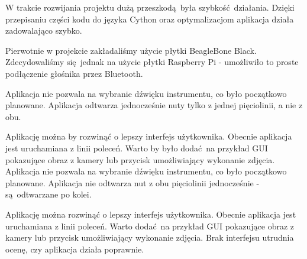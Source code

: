 \documentclass[12pt]{article}
\begin{document}
W trakcie rozwijania projektu dużą przeszkodą była szybkość działania. Dzięki przepisaniu części kodu do języka Cython oraz optymalizacjom aplikacja działa zadowalająco szybko.
	
Pierwotnie w projekcie zakładaliśmy użycie płytki BeagleBone Black. Zdecydowaliśmy się jednak na użycie płytki Raspberry Pi - umożliwiło to proste podłączenie głośnika przez Bluetooth.
	
Aplikacja nie pozwala na wybranie dźwięku instrumentu, co było początkowo planowane. Aplikacja odtwarza jednocześnie nuty tylko z jednej pięciolinii, a nie z obu.

Aplikację można by rozwinąć o lepszy interfejs użytkownika. Obecnie aplikacja jest uruchamiana z linii poleceń. Warto by było dodać na przykład GUI pokazujące obraz z kamery lub przycisk umożliwiający wykonanie zdjęcia.
Aplikacja nie pozwala na wybranie dźwięku instrumentu, co było początkowo planowane. Aplikacja nie odtwarza nut z obu pięciolinii jednocześnie - są odtwarzane po kolei.
	
Aplikację można rozwinąć o lepszy interfejs użytkownika. Obecnie aplikacja jest uruchamiana z linii poleceń. Warto dodać na przykład GUI pokazujące obraz z kamery lub przycisk umożliwiający wykonanie zdjęcia. Brak interfejsu utrudnia ocenę, czy aplikacja działa poprawnie.
\end{document}
